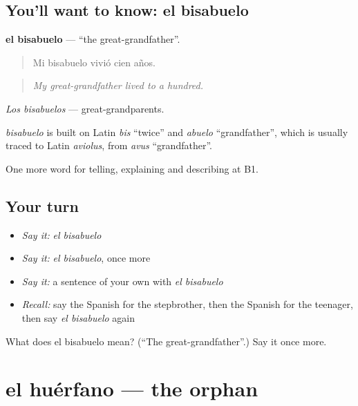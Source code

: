 \subsection*{You'll want to know: el bisabuelo}
\textbf{el bisabuelo} — \textquotedblleft{}the great-grandfather\textquotedblright{}.

\begin{quote}
Mi bisabuelo vivió cien años.
\end{quote}

\begin{quote}
\emph{My great-grandfather lived to a hundred.}
\end{quote}

\emph{Los bisabuelos} — great-grandparents.

\begin{cousinweb}
\emph{bisabuelo} is built on Latin \emph{bis} \textquotedblleft{}twice\textquotedblright{} and \emph{abuelo} \textquotedblleft{}grandfather\textquotedblright{}, which is usually traced to Latin \emph{aviolus}, from \emph{avus} \textquotedblleft{}grandfather\textquotedblright{}.
\end{cousinweb}

\begin{grammarlens}[title={What you've built}]
One more word for telling, explaining and describing at B1.
\end{grammarlens}

\subsection*{Your turn}
\begin{itemize}
\raggedright
  \item \emph{Say it:} \emph{el bisabuelo}
  \item \emph{Say it:} \emph{el bisabuelo}, once more
  \item \emph{Say it:} a sentence of your own with \emph{el bisabuelo}
  \item \emph{Recall:} say the Spanish for the stepbrother, then the Spanish for the teenager, then say \emph{el bisabuelo} again
\end{itemize}

\begin{tcolorbox}[breakable,colback=teal!4,colframe=teal!35!black,title={Before you move on}]
What does el bisabuelo mean? (\textquotedblleft{}The great-grandfather\textquotedblright{}.) Say it once more.
\end{tcolorbox}
\section[el huérfano]{el huérfano — the orphan}

